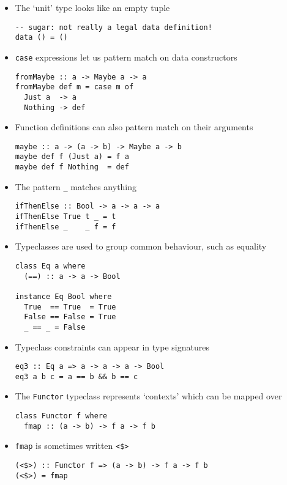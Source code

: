 \begin{itemize}
\item The `unit' type looks like an empty tuple
\begin{verbatim}
-- sugar: not really a legal data definition!
data () = ()
\end{verbatim}

\item \verb|case| expressions let us pattern match on data
  constructors
\begin{verbatim}
fromMaybe :: a -> Maybe a -> a
fromMaybe def m = case m of
  Just a  -> a
  Nothing -> def
\end{verbatim}

\item Function definitions can also pattern match on their arguments
\begin{verbatim}
maybe :: a -> (a -> b) -> Maybe a -> b
maybe def f (Just a) = f a
maybe def f Nothing  = def
\end{verbatim}

\item The pattern \verb|_| matches anything
\begin{verbatim}
ifThenElse :: Bool -> a -> a -> a
ifThenElse True t _ = t
ifThenElse _    _ f = f
\end{verbatim}

\item Typeclasses are used to group common behaviour, such as equality
\begin{verbatim}
class Eq a where
  (==) :: a -> a -> Bool

instance Eq Bool where
  True  == True  = True
  False == False = True
  _ == _ = False
\end{verbatim}

\item Typeclass constraints can appear in type signatures
\begin{verbatim}
eq3 :: Eq a => a -> a -> a -> Bool
eq3 a b c = a == b && b == c
\end{verbatim}

\item The \verb|Functor| typeclass represents `contexts' which can be
  mapped over
\begin{verbatim}
class Functor f where
  fmap :: (a -> b) -> f a -> f b
\end{verbatim}

\item \verb|fmap| is sometimes written \verb|<$>|
\begin{verbatim}
(<$>) :: Functor f => (a -> b) -> f a -> f b
(<$>) = fmap
\end{verbatim}


\end{itemize}
